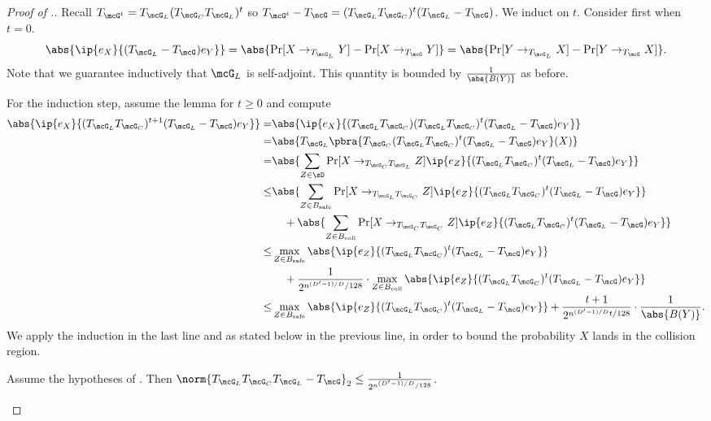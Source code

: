 \begin{proof}[Proof of .]
Recall $T_{\mcG^t} = T_{\mcG_L}(T_{\mcG_C}T_{\mcG_L})^t$ so $T_{\mcG^t} - T_\mcG = (T_{\mcG_L}T_{\mcG_C})^t(T_{\mcG_L} - T_\mcG)$. We induct on $t$. Consider first when $t = 0$.
\begin{equation*}
    \abs{\ip{e_X}{(T_{\mcG_L}-T_{\mcG}) e_Y}} = \abs{\Pr[X \to_{T_{\mcG_L}} Y] - \Pr[X \to_{T_{\mcG}} Y]} = \abs{\Pr[Y \to_{T_{\mcG_L}} X] - \Pr[Y \to_{T_{\mcG}} X]}.
\end{equation*}
Note that we guarantee inductively that $\mcG_L$ is self-adjoint. This quantity is bounded by $\frac{1}{\abs{B(Y)}}$ as before.

For the induction step, assume the lemma for $t \geq 0$ and compute
\begin{align*}
    \abs{\ip{e_X}{(T_{\mcG_L}T_{\mcG_C})^{t+1}(T_{\mcG_L}-T_{\mcG}) e_Y}} 
    =& \abs{\ip{e_X}{(T_{\mcG_L}T_{\mcG_C})(T_{\mcG_L}T_{\mcG_C})^t(T_{\mcG_L}-T_{\mcG}) e_Y}}\\
    =& \abs{T_{\mcG_L}\pbra{T_{\mcG_C}(T_{\mcG_L}T_{\mcG_C})^t(T_{\mcG_L}-T_{\mcG}) e_Y}(X)}\\
    =& \abs{\sum_{Z \in \sD} \Pr[X \to_{T_{\mcG_C}T_{\mcG_L}} Z] \ip{e_Z}{(T_{\mcG_L}T_{\mcG_C})^t(T_{\mcG_L}-T_{\mcG}) e_Y}}\\
    \leq &\abs{\sum_{Z \in B_\text{safe}} \Pr[X \to_{T_{\mcG_L}T_{\mcG_C}} Z] \ip{e_Z}{(T_{\mcG_L}T_{\mcG_C})^t(T_{\mcG_L}-T_{\mcG}) e_Y}}\\
    &\;\;\;\;+ \abs{\sum_{Z \in B_\text{coll}} \Pr[X \to_{T_{\mcG_C}T_{\mcG_C}} Z] \ip{e_Z}{(T_{\mcG_L}T_{\mcG_C})^t(T_{\mcG_L}-T_{\mcG}) e_Y}}\\
    \leq& \max_{Z \in B_{\mathrm{safe}}} \abs{\ip{e_Z}{(T_{\mcG_L}T_{\mcG_C})^t(T_{\mcG_L}-T_{\mcG}) e_Y}}\\
    &\;\;\;\;+ \frac{1}{2^{n^{(D'-1)/D}/128}} \cdot \max_{Z \in B_{\mathrm{coll}}} \abs{\ip{e_Z}{(T_{\mcG_L}T_{\mcG_C})^t(T_{\mcG_L}-T_{\mcG}) e_Y}}\\
    \leq& \max_{Z \in B_{\mathrm{safe}}} \abs{\ip{e_Z}{(T_{\mcG_L}T_{\mcG_C})^t(T_{\mcG_L}-T_{\mcG}) e_Y}} + \frac{t+1}{2^{n^{(D'-1)/D}t/128}} \cdot \frac{1}{\abs{B(Y)}}.
\end{align*}
We apply the induction in the last line and  as stated below in the previous line, in order to bound the probability $X$ lands in the collision region.

\begin{lemma}\label{lem:genspectralnorm}
    Assume the hypotheses of . Then $\norm{T_{\mcG_L}T_{\mcG_C}T_{\mcG_L}-T_{\mcG}}_{2} \leq \frac1{2^{n^{(D'-1)/D}/128}}$.
\end{lemma}


\end{proof}
